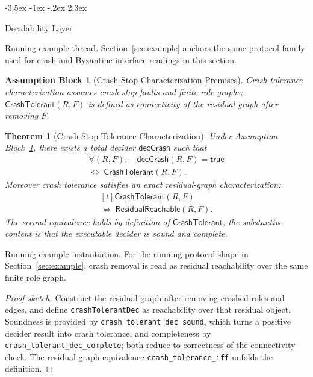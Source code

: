 \documentclass[a4paper,10pt,twocolumn,english]{article}
\makeatletter
\renewcommand{\section}{\@startsection{section}{1}{\z@}%
  {-3.5ex \@plus -1ex \@minus -.2ex}%
  {2.3ex}%
  {\raggedright\normalfont\large\bfseries}}
\numberwithin{equation}{section}
\theoremstyle{paperdef}
\theoremstyle{paperplain}
\newtheorem{theorem}[definition]{Theorem}
\theoremstyle{paperdef}
\newtheorem{assumption}{Assumption Block}[section]
\theoremstyle{paperremark}
\makeatother
\begin{document}
\section{Decidability Layer}
\label{sec:decidability}

Running-example thread. Section~\ref{sec:example} anchors the same protocol
family used for crash and Byzantine interface readings in this section.

\begin{assumption}[Crash-Stop Characterization Premises]
	\label{assump:p2-crash}
	Crash-tolerance characterization assumes crash-stop faults and finite role graphs; $\mathsf{CrashTolerant}(R,F)$ is defined as connectivity of the residual graph after removing $F$.
\end{assumption}

\begin{theorem}[Crash-Stop Tolerance Characterization]
	\label{thm:crash}
	Under Assumption Block~\ref{assump:p2-crash}, there exists a total decider $\mathsf{decCrash}$ such that
	\begin{equation}
		\begin{aligned}
			\forall (R,F),\quad
			\mathsf{decCrash}(R,F) = \mathsf{true}
			\\
			\iff\ \mathsf{CrashTolerant}(R,F).
		\end{aligned}
	\end{equation}
	Moreover crash tolerance satisfies an exact residual-graph characterization:
	\begin{equation}
		\begin{aligned}[t]
			\mathsf{CrashTolerant}(R,F)
			\\
			\iff\ \mathsf{ResidualReachable}(R,F).
		\end{aligned}
	\end{equation}
	The second equivalence holds by definition of $\mathsf{CrashTolerant}$; the substantive content is that the executable decider is sound and complete.
\end{theorem}

Running-example instantiation. For the running protocol shape in
Section~\ref{sec:example}, crash removal is read as residual reachability over
the same finite role graph.

\begin{proof}[Proof sketch]
	Construct the residual graph after removing crashed roles and edges, and define \texttt{crashTolerantDec} as reachability over that residual object. Soundness is provided by \nolinkurl{crash_tolerant_dec_sound}, which turns a positive decider result into crash tolerance, and completeness by \nolinkurl{crash_tolerant_dec_complete}; both reduce to correctness of the connectivity check. The residual-graph equivalence \nolinkurl{crash_tolerance_iff} unfolds the definition.
\end{proof}
\end{document}
